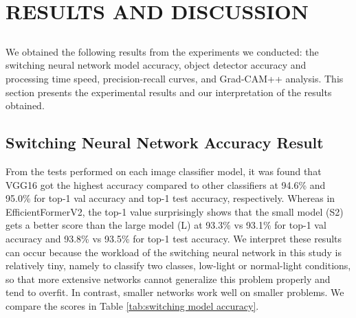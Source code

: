 \chapter{RESULTS AND DISCUSSION}
\label{sec:chap4_pengujian}
\vspace{1ex}

\section*{}

We obtained the following results from the experiments we conducted: the switching neural network model accuracy, object detector accuracy and processing time speed, precision-recall curves, and Grad-CAM++ analysis. This section presents the experimental results and our interpretation of the results obtained. 

\section{Switching Neural Network Accuracy Result}
From the tests performed on each image classifier model, it was found that VGG16 got the highest accuracy compared to other classifiers at 94.6\% and 95.0\% for top-1 val accuracy and top-1 test accuracy, respectively. Whereas in EfficientFormerV2, the top-1 value surprisingly shows that the small model (S2) gets a better score than the large model (L) at 93.3\% vs 93.1\%  for top-1 val accuracy and 93.8\% vs 93.5\% for top-1 test accuracy. We interpret these results can occur because the workload of the switching neural network in this study is relatively tiny, namely to classify two classes, low-light or normal-light conditions, so that more extensive networks cannot generalize this problem properly and tend to overfit. In contrast, smaller networks work well on smaller problems. We compare the scores in Table \ref{tab:switching model accuracy}.

